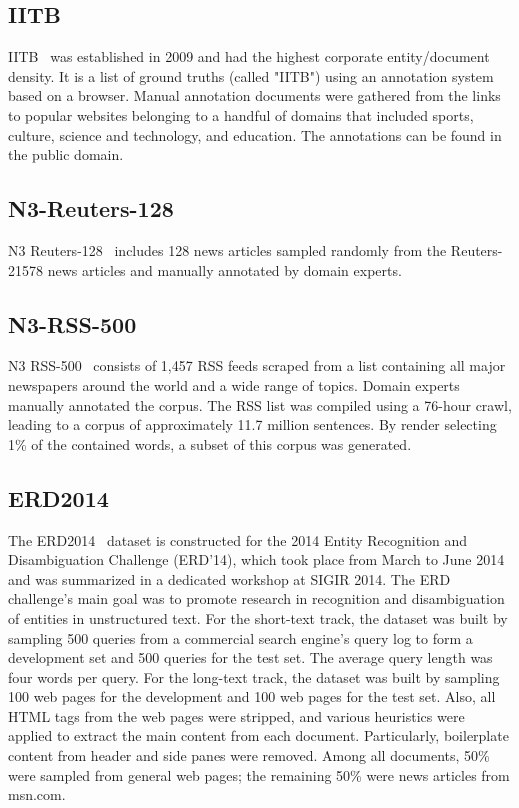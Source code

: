 \documentclass{article}
\begin{document}
\subsection{IITB}
IITB~\cite{kulkarni2009collective} was established in 2009 and had the highest corporate entity/document density.
It is a list of ground truths (called "IITB") using an annotation system based on a browser. Manual annotation documents were gathered from the links to popular websites belonging to a handful of domains that included sports, culture, science and technology, and education. The annotations can be found in the public domain.

\subsection{N3-Reuters-128}
N3 Reuters-128~\cite{roder2014n3} includes 128 news articles sampled randomly from the Reuters-21578 news articles and manually annotated by domain experts.

\subsection{N3-RSS-500}
N3 RSS-500~\cite{roder2014n3} consists of 1,457 RSS feeds scraped from a list containing all major newspapers around the world and a wide range of topics. Domain experts manually annotated the corpus.
The RSS list was compiled using a 76-hour crawl, leading to a corpus of approximately 11.7 million sentences. By render selecting 1\% of the contained words, a subset of this corpus was generated.

\subsection{ERD2014}
The ERD2014~\cite{carmel2014erd} dataset is constructed for the 2014 Entity Recognition and Disambiguation Challenge (ERD'14), which took place from March to June 2014 and was summarized in a dedicated workshop at SIGIR 2014. The ERD challenge's main goal was to promote research in recognition and disambiguation of entities in unstructured text.
For the short-text track, the dataset was built by sampling 500 queries from a commercial search engine's query log to form a development set and 500 queries for the test set. The average query length was four words per query. For the long-text track, the dataset was built by sampling 100 web pages for the development and 100 web pages for the test set. Also, all HTML tags from the web pages were stripped, and various heuristics were applied to extract the main content from each document. Particularly,
boilerplate content from header and side panes were removed. Among all documents, 50\%
were sampled from general web pages; the remaining 50\% were news articles from msn.com.
\end{document}
